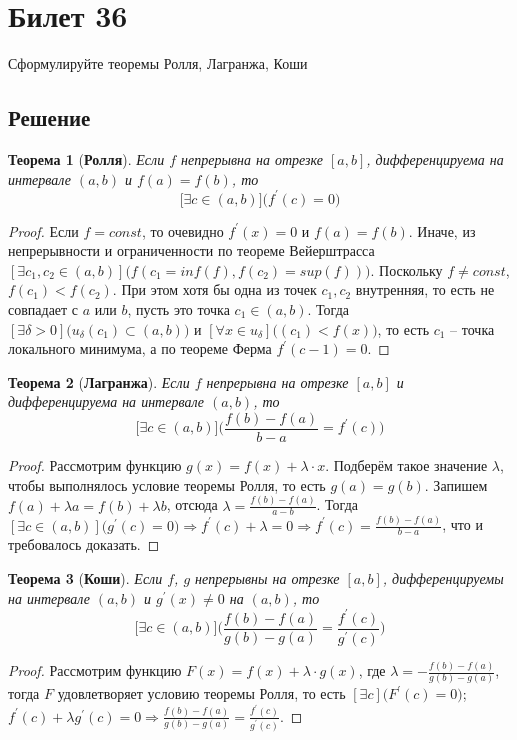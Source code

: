 \documentclass[a4paper,12pt]{article}
\newtheorem*{ther}{Теорема}
\newcommand{\drv}{^{\prime}}
\begin{document}
    \section*{Билет 36}
    Сформулируйте теоремы Ролля, Лагранжа, Коши

    \subsection*{Решение}
    \begin{ther}[\textbf{Ролля}]
        Если $f$ непрерывна на отрезке $[a,b]$, дифференцируема на интервале
        $(a,b)$ и $f(a)=f(b)$, то
        $$\big[\exists c \in (a,b)\big]\big(f\drv(c) = 0\big)$$
    \end{ther}
    \begin{proof}
        Если $f=const$, то очевидно $f\drv(x)=0$ и $f(a)=f(b)$. Иначе, из
        непрерывности и ограниченности по теореме Вейерштрасса $[\exists c_1,
        c_2\in(a,b)]\big(f(c_1 = inf(f), f(c_2)=sup(f))\big)$. Поскольку $f\neq
        const$, $f(c_1)<f(c_2)$. При этом хотя бы одна из точек $c_1, c_2$
        внутренняя, то есть не совпадает с $a$ или $b$, пусть это точка
        $c_1\in(a,b)$. Тогда $[\exists
        \delta>0]\big(u_{\delta}(c_1)\subset(a,b)\big)$ и $[\forall x \in u_{\delta}
        ]\big((c_1) < f(x)\big)$, то есть $c_1$ -- точка локального минимума, а
        по теореме Ферма $f\drv(c-1) = 0$.
    \end{proof}


    \begin{ther}[\textbf{Лагранжа}]
        Если $f$ непрерывна на отрезке $[a,b]$ и дифференцируема на интервале
        $(a,b)$, то $$\big[\exists c \in (a,b)\big]\Big(
        \frac{f(b)-f(a)}{b-a}=f\drv(c) \Big)$$
    \end{ther}
    \begin{proof}
        Рассмотрим функцию $g(x) = f(x)+\lambda\cdot x$. Подберём такое
        значение $\lambda$, чтобы выполнялось условие теоремы Ролля, то есть
        $g(a)=g(b)$. Запишем $f(a) + \lambda a = f(b) + \lambda b$, отсюда
        $\lambda = \frac{f(b)-f(a)}{a-b}$. Тогда $[\exists c \in
        (a,b)]\big(g\drv(c) = 0\big)\Rightarrow f\drv(c) + \lambda = 0
        \Rightarrow f\drv(c) = \frac{f(b)-f(a)}{b-a}$, что и требовалось
        доказать.
    \end{proof}


    \begin{ther}[\textbf{Коши}]
        Если $f$, $g$ непрерывны на отрезке $[a,b]$, дифференцируемы на интервале
        $(a,b)$ и $g\drv(x)\neq 0$ на $(a,b)$, то $$\big[\exists c \in
        (a,b)\big]\Big(
        \frac{f(b)-f(a)}{g(b)-g(a)}=\frac{f\drv(c)}{g\drv(c)} \Big)$$
    \end{ther}
    \begin{proof}
        Рассмотрим функцию $F(x) = f(x)+\lambda\cdot g(x)$, где
        $\lambda = -\frac{f(b)-f(a)}{g(b)-g(a)}$, тогда $F$ удовлетворяет
        условию теоремы Ролля, то есть $[\exists c]\big( F\drv(c) = 0\big)$;
        $f\drv(c)+\lambda g\drv(c) = 0 \Rightarrow \frac{f(b)-f(a)}{g(b)-g(a)}
        = \frac{f\drv(c)}{g\drv(c)}$.
    \end{proof}
\end{document}
